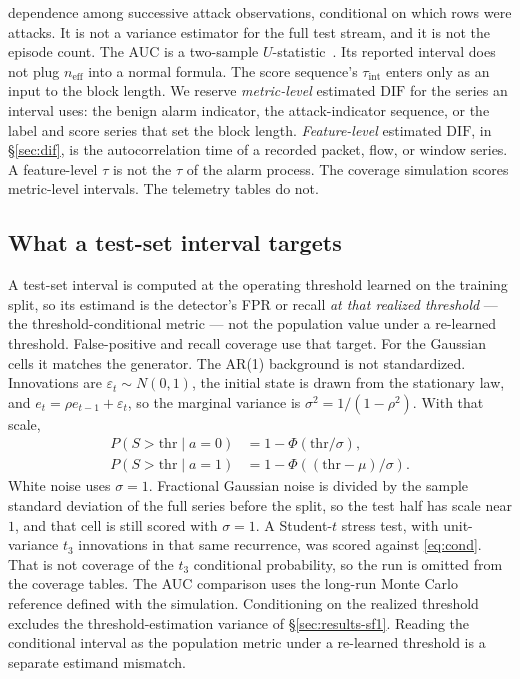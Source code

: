 \documentclass[a4paper,fleqn]{cas-dc}
\newcommand{\DIF}{\mathrm{DIF}}
\newcommand{\neff}{n_{\mathrm{eff}}}
\begin{document}
dependence among successive attack observations, conditional on which rows were attacks. It is not
a variance estimator for the full test stream, and it is not the episode count. The AUC is a
two-sample $U$-statistic~\citep{hoeffding1948ustat}. Its reported interval does not plug
$\neff$ into a normal formula. The score sequence's $\tau_{\mathrm{int}}$ enters only as an input
to the block length. We reserve \emph{metric-level} estimated $\DIF$ for the series an interval
uses: the benign alarm indicator, the attack-indicator sequence, or the label and score series that
set the block length. \emph{Feature-level} estimated $\DIF$, in \S\ref{sec:dif}, is the
autocorrelation time of a recorded packet, flow, or window series. A feature-level $\tau$ is not
the $\tau$ of the alarm process. The coverage simulation scores metric-level intervals. The
telemetry tables do not.

\subsection{What a test-set interval targets}
A test-set interval is computed at the operating threshold learned on the training split, so its
estimand is the detector's FPR or recall \emph{at that realized threshold} --- the
threshold-conditional metric --- not the population value under a re-learned threshold. False-positive
and recall coverage use that target. For the Gaussian cells it matches the generator. The AR(1)
background is not standardized. Innovations are $\varepsilon_t\sim N(0,1)$, the initial state is
drawn from the stationary law, and
$e_t=\rho e_{t-1}+\varepsilon_t$, so the marginal variance is $\sigma^2=1/(1-\rho^2)$. With that
scale,
\begin{equation}
\begin{aligned}
P(S>\mathrm{thr}\mid a{=}0)&=1-\Phi(\mathrm{thr}/\sigma),\\
P(S>\mathrm{thr}\mid a{=}1)&=1-\Phi((\mathrm{thr}-\mu)/\sigma).
\end{aligned}
\label{eq:cond}
\end{equation}
White noise uses $\sigma=1$. Fractional Gaussian noise is divided by the sample standard deviation
of the full series before the split, so the test half has scale near $1$, and that cell is still
scored with $\sigma=1$. A Student-$t$ stress test, with unit-variance $t_3$ innovations in that
same recurrence, was scored against \eqref{eq:cond}. That is not coverage of the $t_3$ conditional
probability, so the run is omitted from the coverage tables. The AUC comparison uses the long-run
Monte Carlo reference defined with the simulation. Conditioning on the
realized threshold excludes the threshold-estimation variance of \S\ref{sec:results-sf1}. Reading
the conditional interval as the population metric under a re-learned threshold is a separate
estimand mismatch.
\end{document}
